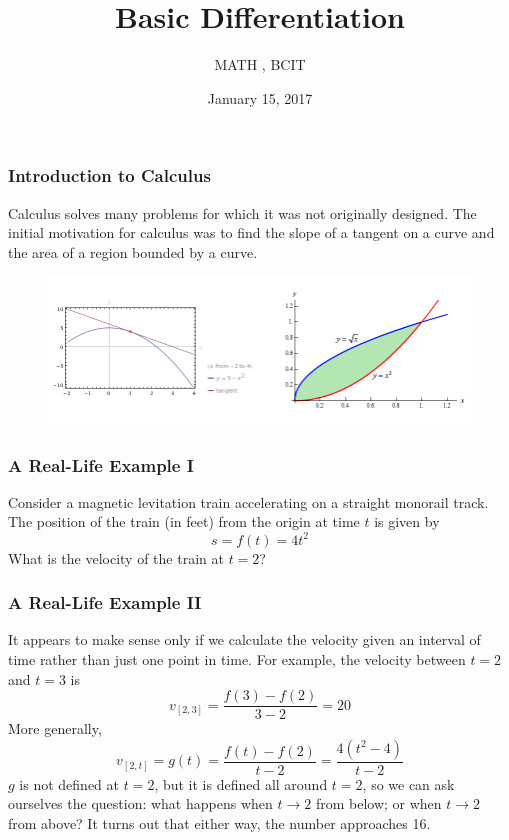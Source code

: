 \documentclass[xcolor=dvipsnames]{beamer}
\title{Basic Differentiation}
\subtitle{MATH {\CourseNumber}, BCIT}
\author{\CourseName}
\date{January 15, 2017}
\begin{document}
\begin{frame}
  \titlepage
\end{frame}

\begin{frame}
  \frametitle{Introduction to Calculus}
\alert{Calculus} solves many problems for which it was not originally
designed. The initial motivation for calculus was to find the slope of
a tangent on a curve and the area of a region bounded by a curve.
  \begin{figure}[h]
    \includegraphics[scale=.35]{./diagrams/regiontangent.png}
  \end{figure}
\end{frame}

\begin{frame}
  \frametitle{A Real-Life Example I}
Consider a magnetic levitation train accelerating on a straight
monorail track. The position of the train (in feet) from the origin at
time $t$ is given by
\begin{equation}
  \label{eq:pupibahk}
  s=f(t)=4t^{2}
\end{equation}
What is the velocity of the train at $t=2$?
\end{frame}

\begin{frame}
  \frametitle{A Real-Life Example II}
It appears to make sense only if we calculate the velocity given an
interval of time rather than just one point in time. For example, the
velocity between $t=2$ and $t=3$ is 
\begin{equation}
  \label{eq:einohkie}
  v_{[2,3]}=\frac{f(3)-f(2)}{3-2}=20
\end{equation}
More generally,
\begin{equation}
  \label{eq:phaedais}
  v_{[2,t]}=g(t)=\frac{f(t)-f(2)}{t-2}=\frac{4(t^{2}-4)}{t-2}
\end{equation}
$g$ is not defined at $t=2$, but it is defined all around $t=2$, so we
can ask ourselves the question: what happens when $t\rightarrow{}2$
from below; or when $t\rightarrow{}2$ from above? It turns out that
either way, the number approaches 16.
\end{frame}
\end{document}
